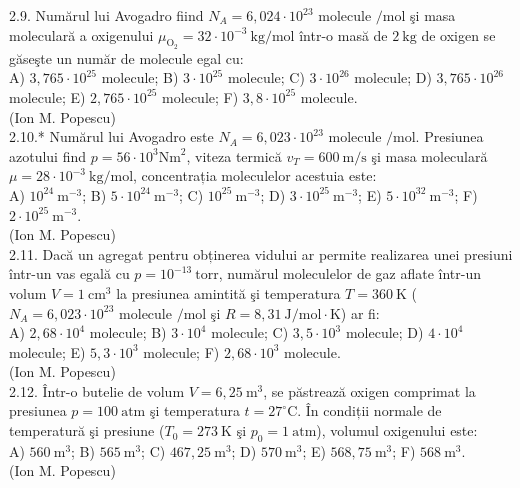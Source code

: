 2.9. Numărul lui Avogadro fiind $N_{A}=6,024 \cdot 10^{23}$ molecule $/ \mathrm{mol}$ şi masa moleculară a oxigenului $\mu_{\mathrm{O}_{2}}=32 \cdot 10^{-3} \mathrm{~kg} / \mathrm{mol}$ într-o masă de $2 \mathrm{~kg}$ de oxigen se găseşte un număr de molecule egal cu:\\ A) $3,765 \cdot 10^{25}$ molecule; B) $3 \cdot 10^{25}$ molecule; C) $3 \cdot 10^{26}$ molecule; D) $3,765 \cdot 10^{26}$ molecule; E) $2,765 \cdot 10^{25}$ molecule; F) $3,8 \cdot 10^{25}$ molecule.\\ (Ion M. Popescu)\\

2.10.* Numărul lui Avogadro este $N_{A}=6,023 \cdot 10^{23}$ molecule $/ \mathrm{mol}$. Presiunea azotului find $p=56 \cdot 10^{3} \mathrm{Nm}^{2}$, viteza termică $v_{T}=600 \mathrm{~m} / \mathrm{s}$ şi masa moleculară $\mu=28 \cdot 10^{-3} \mathrm{~kg} / \mathrm{mol}$, concentrația moleculelor acestuia este:\\ A) $10^{24} \mathrm{~m}^{-3}$; B) $5 \cdot 10^{24} \mathrm{~m}^{-3}$; C) $10^{25} \mathrm{~m}^{-3}$; D) $3 \cdot 10^{25} \mathrm{~m}^{-3}$; E) $5 \cdot 10^{32} \mathrm{~m}^{-3}$; F) $2 \cdot 10^{25} \mathrm{~m}^{-3}$.\\ (Ion M. Popescu)\\

2.11. Dacă un agregat pentru obținerea vidului ar permite realizarea unei presiuni într-un vas egală cu $p=10^{-13} \mathrm{~torr}$, numărul moleculelor de gaz aflate într-un volum $V=1 \mathrm{~cm}^{3}$ la presiunea amintită şi temperatura $T=360 \mathrm{~K}$ ($N_{A}=6,023 \cdot 10^{23}$ molecule $/ \mathrm{mol}$ şi $R=8,31 \mathrm{~J} / \mathrm{mol} \cdot \mathrm{K}$) ar fi:\\ A) $2,68 \cdot 10^{4}$ molecule; B) $3 \cdot 10^{4}$ molecule; C) $3,5 \cdot 10^{3}$ molecule; D) $4 \cdot 10^{4}$ molecule; E) $5,3 \cdot 10^{3}$ molecule; F) $2,68 \cdot 10^{3}$ molecule.\\ (Ion M. Popescu)\\

2.12. Într-o butelie de volum $V=6,25 \mathrm{~m}^{3}$, se păstrează oxigen comprimat la presiunea $p=100 \mathrm{~atm}$ şi temperatura $t=27^{\circ} \mathrm{C}$. În condiții normale de temperatură şi presiune ($T_{0}=273 \mathrm{~K}$ şi $p_{0}=1 \mathrm{~atm}$), volumul oxigenului este:\\ A) $560 \mathrm{~m}^{3}$; B) $565 \mathrm{~m}^{3}$; C) $467,25 \mathrm{~m}^{3}$; D) $570 \mathrm{~m}^{3}$; E) $568,75 \mathrm{~m}^{3}$; F) $568 \mathrm{~m}^{3}$.\\ (Ion M. Popescu)\\

